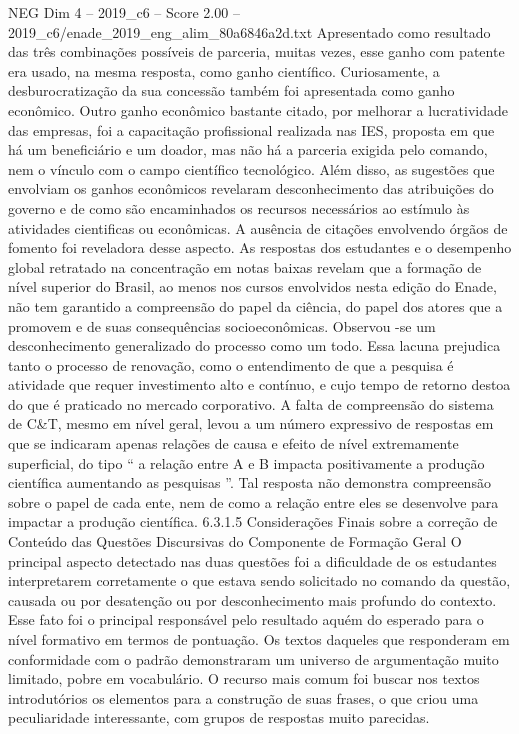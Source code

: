 \begin{textsample}{NEG Dim 4 – 2019\_c6 – Score 2.00 – 2019\_c6/enade\_2019\_eng\_alim\_80a6846a2d.txt}
Apresentado como resultado das três combinações possíveis de parceria, muitas vezes, esse ganho com patente era usado, na mesma resposta, como ganho científico.
Curiosamente, a desburocratização da sua concessão também foi apresentada como ganho econômico.
Outro ganho econômico bastante citado, por melhorar a lucratividade das empresas, foi a capacitação profissional realizada nas IES, proposta em que há um beneficiário e um doador, mas não há a parceria exigida pelo comando, nem o vínculo com o campo científico tecnológico.
Além disso, as sugestões que envolviam os ganhos econômicos revelaram desconhecimento das atribuições do governo e de como são encaminhados os recursos necessários ao estímulo às atividades cientificas ou econômicas.
A ausência de citações envolvendo órgãos de fomento foi reveladora desse aspecto.
As respostas dos estudantes e o desempenho global retratado na concentração em notas baixas revelam que a formação de nível superior do Brasil, ao menos nos cursos envolvidos nesta edição do Enade, não tem garantido a compreensão do papel da ciência, do papel dos atores que a promovem e de suas consequências socioeconômicas.
Observou -se um desconhecimento generalizado do processo como um todo.
Essa lacuna prejudica tanto o processo de renovação, como o entendimento de que a pesquisa é atividade que requer investimento alto e contínuo, e cujo tempo de retorno destoa do que é praticado no mercado corporativo.
A falta de compreensão do sistema de C\&T, mesmo em nível geral, levou a um número expressivo de respostas em que se indicaram apenas relações de causa e efeito de nível extremamente superficial, do tipo “ a relação entre A e B impacta positivamente a produção científica aumentando as pesquisas ”.
Tal resposta não demonstra compreensão sobre o papel de cada ente, nem de como a relação entre eles se desenvolve para impactar a produção científica. 6.3.1.5 Considerações Finais sobre a correção de Conteúdo das Questões Discursivas do Componente de Formação Geral O principal aspecto detectado nas duas questões foi a dificuldade de os estudantes interpretarem corretamente o que estava sendo solicitado no comando da questão, causada ou por desatenção ou por desconhecimento mais profundo do contexto.
Esse fato foi o principal responsável pelo resultado aquém do esperado para o nível formativo em termos de pontuação.
Os textos daqueles que responderam em conformidade com o padrão demonstraram um universo de argumentação muito limitado, pobre em vocabulário.
O recurso mais comum foi buscar nos textos introdutórios os elementos para a construção de suas frases, o que criou uma peculiaridade interessante, com grupos de respostas muito parecidas.

\end{textsample}
